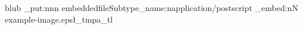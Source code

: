 \documentclass{article}
\begin{document}
blub
\ExplSyntaxOn
\pdfdict_put:nnn {embeddedfile}{Subtype}{\pdftool_name:n{application/postscript}}
\pdffile_embed:nN {example-image.eps}\l_tmpa_tl
\ExplSyntaxOff
\end{document}
